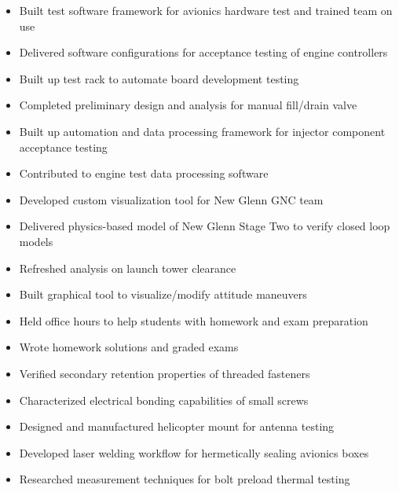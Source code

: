 \documentclass{resume}
\begin{document}
\begin{itemize}
    \item Built test software framework for avionics hardware test and trained team on use
    \item Delivered software configurations for acceptance testing of engine controllers
    \item Built up test rack to automate board development testing
    \item Completed preliminary design and analysis for manual fill/drain valve
    \item Built up automation and data processing framework for injector component acceptance testing
    \item Contributed to engine test data processing software
\end{itemize}
\begin{itemize}
    \item Developed custom visualization tool for New Glenn GNC team
    \item Delivered physics-based model of New Glenn Stage Two to verify closed loop models
    \item Refreshed analysis on launch tower clearance
    \item Built graphical tool to visualize/modify attitude maneuvers
\end{itemize}
\begin{itemize}
    \item Held office hours to help students with homework and exam preparation
    \item Wrote homework solutions and graded exams
\end{itemize}
\begin{itemize}
    \item Verified secondary retention properties of threaded fasteners
    \item Characterized electrical bonding capabilities of small screws
    \item Designed and manufactured helicopter mount for antenna testing
    \item Developed laser welding workflow for hermetically sealing avionics boxes
    \item Researched measurement techniques for bolt preload thermal testing
\end{itemize}
\end{document}
